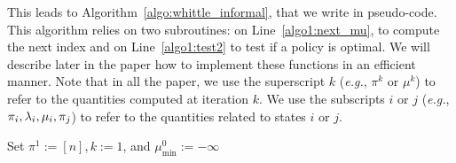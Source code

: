 \documentclass[acmsmall,screen,anonymous]{acmart}
\begin{document}
This leads to Algorithm~\ref{algo:whittle_informal}, that we write in pseudo-code. %
This algorithm relies on two subroutines: on Line~\ref{algo1:next_mu}, to compute the next index and on Line~\ref{algo1:test2} to test if a policy is optimal. We will describe later in the paper how to implement these functions in an efficient manner.  Note that in all the paper, we use the superscript $k$ (\emph{e.g.}, $\pi^k$ or $\mu^k$) to refer to the quantities computed at iteration $k$. We use the subscripts $i$ or $j$ (\emph{e.g.}, $\pi_i, \lambda_i, \mu_i, \pi_j$) to refer to the quantities related to states $i$ or $j$.
\begin{algorithm}[ht]
    \DontPrintSemicolon
    Set $\pi^1:=[n], k:=1$, and $\mu^0_{\min}:=-\infty$\;
    \caption{Test indexability and compute Whittle index if the problem is indexable.}
    \label{algo:whittle_informal}
\end{algorithm}
\end{document}
